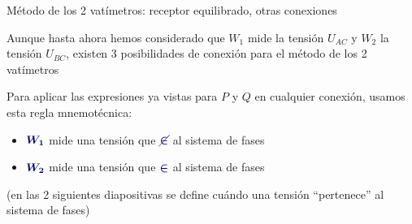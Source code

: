 \documentclass[aspectratio=169, usenames,svgnames,dvipsnames]{beamer}
\begin{document}
\begin{frame}{Método de los 2 vatímetros: \hspace{3mm}receptor equilibrado, \hspace{3mm}otras conexiones} \label{diapo:2vat_reglaMnemotecnica}

    \vspace{1mm}
    Aunque hasta ahora hemos considerado que $W_1$ mide la tensión $U_{AC}$ y $W_2$ la tensión $U_{BC}$, existen \alert{3 posibilidades de conexión} para el método de los 2 vatímetros
    
    Para aplicar las expresiones ya vistas para $P$ y $Q$ en cualquier conexión, usamos esta \alert{regla mnemotécnica}: 
    \begin{itemize}
        \item ${\boldsymbol{\color{blue!50!black} W_1}}$ mide una \alert{tensión que} ${\boldsymbol{\color{blue!50!black} \cancel{\in}}}$ al sistema de fases
        \item ${\boldsymbol{\color{blue!50!black} W_2}}$ mide una \alert{tensión que} ${\boldsymbol{\color{blue!50!black} \in}}$ al sistema de fases
    \end{itemize}

    \centering\small{(en las 2 siguientes diapositivas se define cuándo una tensión ``pertenece'' al sistema de fases)}
    

\end{frame}
\end{document}

